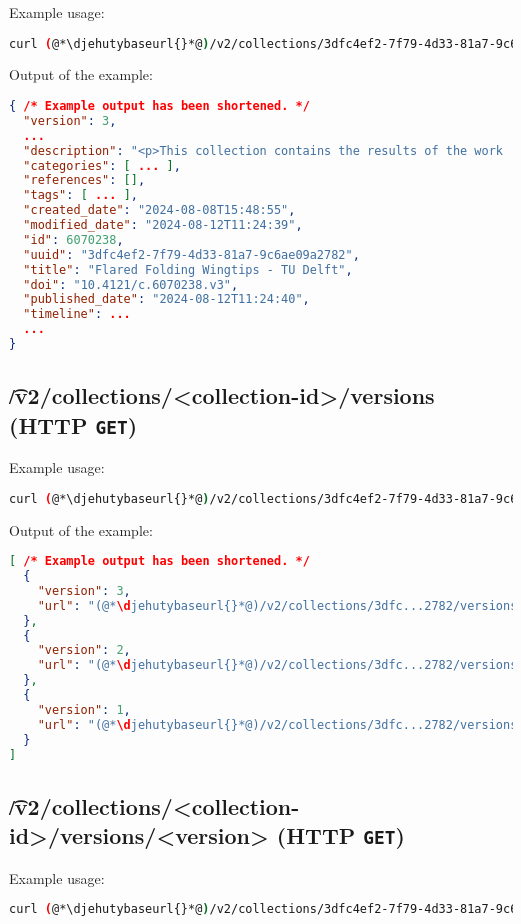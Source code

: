   Example usage:
\begin{lstlisting}[language=bash]
curl (@*\djehutybaseurl{}*@)/v2/collections/3dfc4ef2-7f79-4d33-81a7-9c6ae09a2782 | jq
\end{lstlisting}

  Output of the example:
\begin{lstlisting}[language=JSON]
{ /* Example output has been shortened. */
  "version": 3,
  ...
  "description": "<p>This collection contains the results of the work ...",
  "categories": [ ... ],
  "references": [],
  "tags": [ ... ],
  "created_date": "2024-08-08T15:48:55",
  "modified_date": "2024-08-12T11:24:39",
  "id": 6070238,
  "uuid": "3dfc4ef2-7f79-4d33-81a7-9c6ae09a2782",
  "title": "Flared Folding Wingtips - TU Delft",
  "doi": "10.4121/c.6070238.v3",
  "published_date": "2024-08-12T11:24:40",
  "timeline": ...
  ...
}
\end{lstlisting}

\subsection{\t{/v2/collections/<collection-id>/versions} (HTTP \texttt{GET})}

  Example usage:
\begin{lstlisting}[language=bash]
curl (@*\djehutybaseurl{}*@)/v2/collections/3dfc4ef2-7f79-4d33-81a7-9c6ae09a2782/versions | jq
\end{lstlisting}

  Output of the example:
\begin{lstlisting}[language=JSON]
[ /* Example output has been shortened. */
  {
    "version": 3,
    "url": "(@*\djehutybaseurl{}*@)/v2/collections/3dfc...2782/versions/3"
  },
  {
    "version": 2,
    "url": "(@*\djehutybaseurl{}*@)/v2/collections/3dfc...2782/versions/2"
  },
  {
    "version": 1,
    "url": "(@*\djehutybaseurl{}*@)/v2/collections/3dfc...2782/versions/1"
  }
]
\end{lstlisting}

\subsection{\t{/v2/collections/<collection-id>/versions/<version>} (HTTP \texttt{GET})}

  Example usage:
\begin{lstlisting}[language=bash]
curl (@*\djehutybaseurl{}*@)/v2/collections/3dfc4ef2-7f79-4d33-81a7-9c6ae09a2782/versions/2 | jq
\end{lstlisting}

